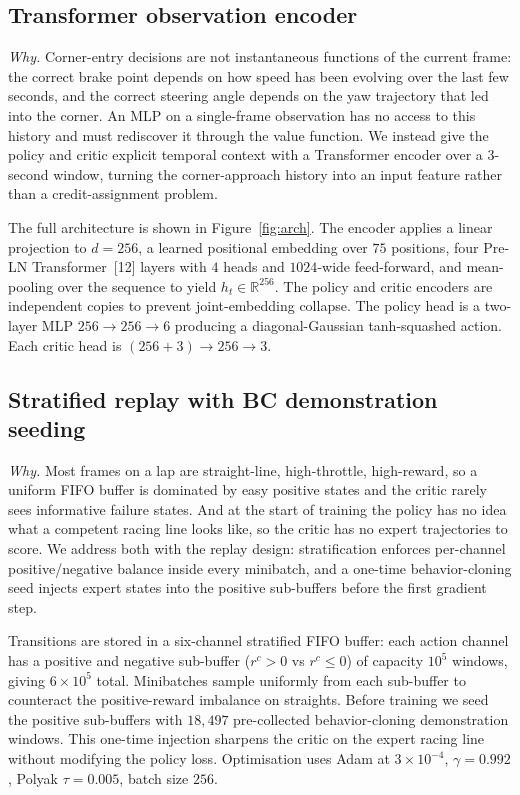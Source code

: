 \documentclass{article}
\begin{document}
\subsection{Transformer observation encoder}
\label{sec:encoder}

\emph{Why.} Corner-entry decisions are not instantaneous functions
of the current frame: the correct brake point depends on how speed
has been evolving over the last few seconds, and the correct
steering angle depends on the yaw trajectory that led into the
corner. An MLP on a single-frame observation has no access to this
history and must rediscover it through the value function. We
instead give the policy and critic explicit temporal context with
a Transformer encoder over a $3$-second window, turning the
corner-approach history into an input feature rather than a
credit-assignment problem.

The full architecture is shown in Figure~\ref{fig:arch}. The encoder
applies a linear projection to $d{=}256$, a learned
positional embedding over $75$ positions, four Pre-LN
Transformer~[12] layers with $4$ heads and $1024$-wide feed-forward,
and mean-pooling
over the sequence to yield $h_t \in \mathbb{R}^{256}$. The policy and
critic encoders are independent copies to prevent joint-embedding
collapse. The policy head is a two-layer MLP
$256\!\to\!256\!\to\!6$ producing a diagonal-Gaussian tanh-squashed
action. Each critic head is $(256{+}3)\!\to\!256\!\to\!3$.

\subsection{Stratified replay with BC demonstration seeding}
\label{sec:replay}

\emph{Why.} Most frames on a lap are straight-line, high-throttle,
high-reward, so a uniform FIFO buffer is dominated by easy positive
states and the critic rarely sees informative failure states. And
at the start of training the policy has no idea what a competent
racing line looks like, so the critic has no expert trajectories to
score. We address both with the replay design: stratification
enforces per-channel positive/negative balance inside every
minibatch, and a one-time behavior-cloning seed injects expert
states into the positive sub-buffers before the first gradient
step.

Transitions are stored in a six-channel stratified FIFO buffer: each
action channel has a positive and negative sub-buffer ($r^c{>}0$ vs
$r^c{\le}0$) of capacity $10^5$ windows, giving $6{\times}10^5$
total. Minibatches sample uniformly from each sub-buffer to counteract
the positive-reward imbalance on straights. Before training we seed
the positive sub-buffers with $18{,}497$ pre-collected behavior-cloning
demonstration windows. This one-time injection sharpens the critic on
the expert racing line without modifying the policy loss. Optimisation
uses Adam at $3{\times}10^{-4}$, $\gamma{=}0.992$, Polyak
$\tau{=}0.005$, batch size $256$.
\end{document}
